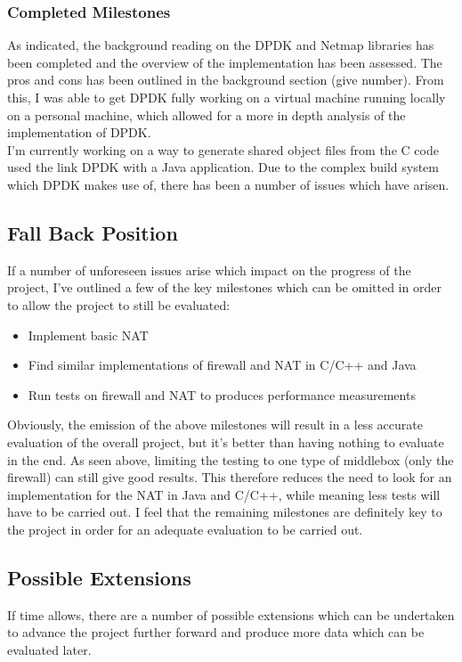 \documentclass[a4paper, titlepage]{article}
\begin{document}
\subsubsection{Completed Milestones}
As indicated, the background reading on the DPDK and Netmap libraries has been completed and the overview of the implementation has been assessed. The pros and cons has been outlined in the background section (give number). From this, I was able to get DPDK fully working on a virtual machine running locally on a personal machine, which allowed for a more in depth analysis of the implementation of DPDK. \\
\newline
I'm currently working on a way to generate shared object files from the C code used the link DPDK with a Java application. Due to the complex build system which DPDK makes use of, there has been a number of issues which have arisen.

\subsection{Fall Back Position}
If a number of unforeseen issues arise which impact on the progress of the project, I've outlined a few of the key milestones which can be omitted in order to allow the project to still be evaluated:
\begin{itemize}
	\item Implement basic NAT
	\item Find similar implementations of firewall and NAT in C/C++ and Java
	\item Run tests on firewall and NAT to produces performance measurements
\end{itemize}
Obviously, the emission of the above milestones will result in a less accurate evaluation of the overall project, but it's better than having nothing to evaluate in the end. As seen above, limiting the testing to one type of middlebox (only the firewall) can still give good results. This therefore reduces the need to look for an implementation for the NAT in Java and C/C++, while meaning less tests will have to be carried out. I feel that the remaining milestones are definitely key to the project in order for an adequate evaluation to be carried out.

\subsection{Possible Extensions}
If time allows, there are a number of possible extensions which can be undertaken to advance the project further forward and produce more data which can be evaluated later.
\end{document}
